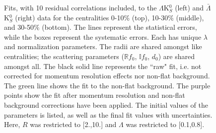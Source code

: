 \documentclass[../AnalysisNoteJBuxton.tex]{subfiles}
\renewcommand{\ResNum}{_10Res}
\renewcommand{\SaveNameModLamKs}{\MomRes\NonFlatBgd\ResNum\PrimMaxDecay\ResMethod\ParamFixAndShareLamKs}
\begin{document}
\pagestyle{empty}
\begin{landscape}

\begin{figure}[h!]
  \centering
  \caption[$\Lambda$K$^{0}_{S}$($\bar{\Lambda}$K$^{0}_{S}$) Fits with 10 Residuals]{Fits, with 10 residual correlations included, to the $\Lambda$K$^{0}_{S}$ (left) and $\bar{\Lambda}$K$^{0}_{S}$ (right) data for the centralities 0-10\% (top), 10-30\% (middle), and 30-50\% (bottom).
The lines represent the statistical errors, while the boxes represent the systematic errors.
Each has unique $\lambda$ and normalization parameters.
The radii are shared amongst like centralities; the scattering parameters ($\mathbb{R}f_{0}$, $\mathbb{I}f_{0}$, $d_{0}$) are shared amongst all.
The black solid line represents the ``raw" fit, i.e. not corrected for momentum resolution effects nor non-flat background.  
The green line shows the fit to the non-flat background.
The purple points show the fit after momentum resolution and non-flat background corrections have been applied.
The initial values of the parameters is listed, as well as the final fit values with uncertainties.
Here, $R$ was restricted to [2.,10.] and $\Lambda$ was restricted to [0.1,0.8].}
  \label{fig:LamK0wConjFits_10Res}
\end{figure}



\end{landscape}
\end{document}
